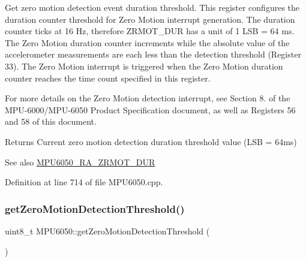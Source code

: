 Get zero motion detection event duration threshold. This register configures the duration counter threshold for Zero Motion interrupt generation. The duration counter ticks at 16 Hz, therefore Z\+R\+M\+O\+T\+\_\+\+D\+UR has a unit of 1 L\+SB = 64 ms. The Zero Motion duration counter increments while the absolute value of the accelerometer measurements are each less than the detection threshold (Register 33). The Zero Motion interrupt is triggered when the Zero Motion duration counter reaches the time count specified in this register.

For more details on the Zero Motion detection interrupt, see Section 8. of the M\+P\+U-\/6000/\+M\+P\+U-\/6050 Product Specification document, as well as Registers 56 and 58 of this document.

\begin{DoxyReturn}{Returns}
Current zero motion detection duration threshold value (L\+SB = 64ms) 
\end{DoxyReturn}
\begin{DoxySeeAlso}{See also}
\mbox{\hyperlink{MPU6050_8h_a57ad8b9e0c77ec27d41b60405ab57e1c}{M\+P\+U6050\+\_\+\+R\+A\+\_\+\+Z\+R\+M\+O\+T\+\_\+\+D\+UR}} 
\end{DoxySeeAlso}


Definition at line 714 of file M\+P\+U6050.\+cpp.


\begin{DoxyCode}{0}

\end{DoxyCode}
\mbox{\label{classMPU6050_ad941c1e844dc9230675c115734599ea3}} 
\subsubsection{\texorpdfstring{getZeroMotionDetectionThreshold()}{getZeroMotionDetectionThreshold()}}
{\footnotesize\ttfamily uint8\+\_\+t M\+P\+U6050\+::get\+Zero\+Motion\+Detection\+Threshold (\begin{DoxyParamCaption}{ }\end{DoxyParamCaption})}

